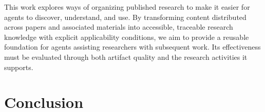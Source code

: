 \documentclass[sigconf,review,anonymous]{acmart}
\begin{document}
This work explores ways of organizing published research to make it easier
for agents to discover, understand, and use. By transforming content distributed
across papers and associated materials into accessible, traceable research
knowledge with explicit applicability conditions, we aim to provide a reusable
foundation for agents assisting researchers with subsequent work. Its
effectiveness must be evaluated through both artifact quality and the research
activities it supports.


\section{Conclusion}
\label{sec:conclusion}

\label{endofbody}




\end{document}
